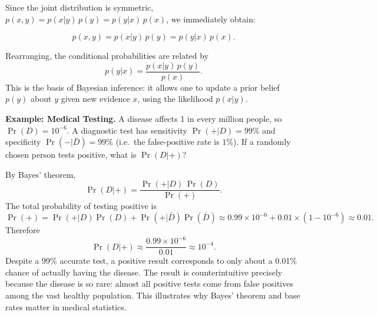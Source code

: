 Since the joint distribution is symmetric, $p(x,y) = p(x|y)\,p(y) = p(y|x)\,p(x)$, we immediately obtain:

\begin{theorem}
\begin{equation}
    p(x,y) = p(x|y)\,p(y) = p(y|x)\,p(x).
\end{equation}
\end{theorem}

Rearranging, the conditional probabilities are related by
\begin{equation}
    p(y|x) = \frac{p(x|y)\,p(y)}{p(x)}.
\end{equation}
This is the basis of Bayesian inference: it allows one to update a prior belief $p(y)$ about $y$ given new evidence $x$, using the likelihood $p(x|y)$.

\textbf{Example: Medical Testing.} A disease affects 1 in every million people, so $\Pr(D) = 10^{-6}$. A diagnostic test has sensitivity $\Pr(+|D) = 99\%$ and specificity $\Pr(-|\bar{D}) = 99\%$ (i.e.\ the false-positive rate is $1\%$). If a randomly chosen person tests positive, what is $\Pr(D|+)$?

By Bayes' theorem,
\begin{equation}
    \Pr(D|+) = \frac{\Pr(+|D)\,\Pr(D)}{\Pr(+)}.
\end{equation}
The total probability of testing positive is
\begin{equation}
    \Pr(+) = \Pr(+|D)\Pr(D) + \Pr(+|\bar{D})\Pr(\bar{D}) \approx 0.99\times 10^{-6} + 0.01\times(1 - 10^{-6}) \approx 0.01.
\end{equation}
Therefore
\begin{equation}
    \Pr(D|+) \approx \frac{0.99\times 10^{-6}}{0.01} \approx 10^{-4}.
\end{equation}
Despite a 99\% accurate test, a positive result corresponds to only about a 0.01\% chance of actually having the disease. The result is counterintuitive precisely because the disease is so rare: almost all positive tests come from false positives among the vast healthy population. This illustrates why Bayes' theorem and base rates matter in medical statistics.
